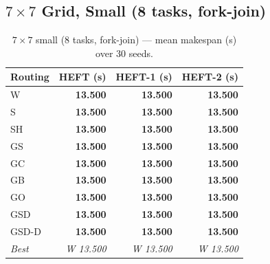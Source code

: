 \documentclass[11pt]{article}
\newcommand{\win}[1]{\textcolor{green!50!black}{\textbf{#1}}}
\begin{document}
\subsection{$7\times7$ Grid, Small (8 tasks, fork-join)}

\begin{table}[H]
\centering\small
\begin{tabular}{l r r r}
\toprule
\textbf{Routing} & \textbf{HEFT (s)} & \textbf{HEFT-1 (s)} & \textbf{HEFT-2 (s)} \\
\midrule
  W & \win{13.500} & \win{13.500} & \win{13.500} \\
  S & \win{13.500} & \win{13.500} & \win{13.500} \\
  SH & \win{13.500} & \win{13.500} & \win{13.500} \\
  GS & \win{13.500} & \win{13.500} & \win{13.500} \\
  GC & \win{13.500} & \win{13.500} & \win{13.500} \\
  GB & \win{13.500} & \win{13.500} & \win{13.500} \\
  GO & \win{13.500} & \win{13.500} & \win{13.500} \\
  GSD & \win{13.500} & \win{13.500} & \win{13.500} \\
  GSD-D & \win{13.500} & \win{13.500} & \win{13.500} \\
\midrule
  \textit{Best} & \textit{W 13.500} & \textit{W 13.500} & \textit{W 13.500} \\
\bottomrule
\end{tabular}
\caption{$7\times7$ small (8 tasks, fork-join) --- mean makespan (s) over 30 seeds.}
\end{table}
\end{document}
